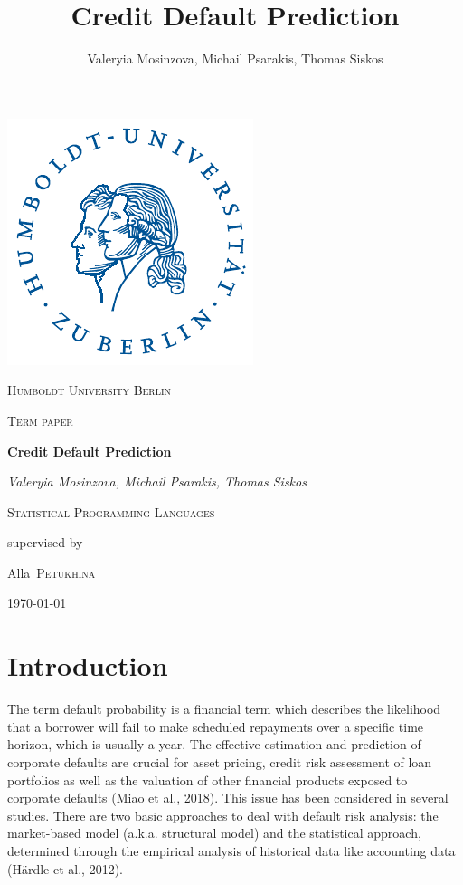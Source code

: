 \documentclass{article}
\title{Credit Default Prediction}
\author{Valeryia Mosinzova, Michail Psarakis, Thomas Siskos}
\date{ }
\begin{document}
\begin{titlepage}
  \begin{center}
  
  \includegraphics[scale=1.25]{hulogo.pdf} \par\vspace{1cm}
  {\scshape\LARGE Humboldt University Berlin \par}
  \vspace{1cm}
  {\scshape\Large Term paper\par}
  \vspace{1.5cm}
  {\huge\bfseries Credit Default Prediction\par}
  \vspace{1cm}
  {\Large\itshape Valeryia Mosinzova, Michail Psarakis, Thomas Siskos \par}
  \vspace{1cm}
  {\Large\scshape Statistical Programming Languages\par}
  \vspace{1cm}
  \vfill
  supervised by \par
  {\Large Alla~\scshape Petukhina \par}
  \vfill
  {\large \today\par}
  \end{center}
\end{titlepage}

\tableofcontents
\newpage

\listoftables
\listoffigures
\listofalgorithms
\newpage

\section{Introduction}

The term default probability is a financial term which describes the likelihood that a borrower will fail to make scheduled repayments over a specific time horizon, which is usually a year. The effective estimation and prediction of corporate defaults are crucial for asset pricing, credit risk assessment of loan portfolios as 
well as the valuation of other financial products exposed to corporate defaults (Miao et al., 2018). This issue has been considered in several studies. There are two basic approaches to deal with default risk analysis: the market-based model (a.k.a. structural model) and the statistical approach, determined through the empirical analysis of historical data like accounting data (H{\"a}rdle et al., 2012).
\end{document}
